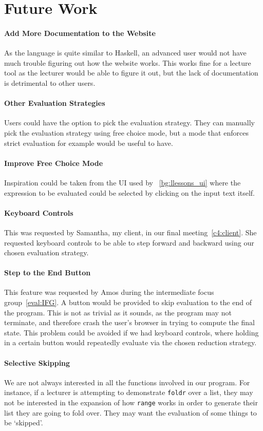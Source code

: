 \section{Future Work}
\label{conc:future_work}
\paragraph{Add More Documentation to the Website} As the language is quite similar to Haskell, an advanced user would not have much trouble figuring out how the website works. This works fine for a lecture tool as the lecturer would be able to figure it out, but the lack of documentation is detrimental to other users. 
\paragraph{Other Evaluation Strategies}
Users could have the option to pick the evaluation strategy. They can manually pick the evaluation strategy using free choice mode, but a mode that enforces strict evaluation for example would be useful to have. 
\paragraph{Improve Free Choice Mode}
Inspiration could be taken from the UI used by \llessons~\ref{bg:llessons_ui} where the expression to be evaluated could be selected by clicking on the input text itself. 
\paragraph{Keyboard Controls} This was requested by Samantha, my client, in our final meeting~\ref{c4:client}. She requested keyboard controls to be able to step forward and backward using our chosen evaluation strategy. 
\paragraph{Step to the End Button} This feature was requested by Amos during the intermediate focus group~\ref{eval:IFG}. A button would be provided to skip evaluation to the end of the program. This is not as trivial as it sounds, as the program may not terminate, and therefore crash the user's browser in trying to compute the final state. This problem could be avoided if we had keyboard controls, where holding in a certain button would repeatedly evaluate via the chosen reduction strategy. 
\paragraph{Selective Skipping}
\label{fw:function_checkboxes}
We are not always interested in all the functions involved in our program. For instance, if a lecturer is attempting to demonstrate \verb|foldr| over a list, they may not be interested in the expansion of how \verb|range| works in order to generate their list they are going to fold over. They may want the evaluation of some things to be `skipped'. 

